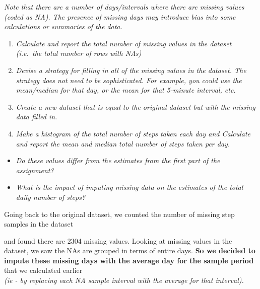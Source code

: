 \documentclass[]{article}
\newenvironment{Shaded}{\begin{snugshade}}{\end{snugshade}}
\newcommand{\KeywordTok}[1]{\textcolor[rgb]{0.13,0.29,0.53}{\textbf{#1}}}
\newcommand{\NormalTok}[1]{#1}
\newcommand{\OperatorTok}[1]{\textcolor[rgb]{0.81,0.36,0.00}{\textbf{#1}}}
\newcommand{\StringTok}[1]{\textcolor[rgb]{0.31,0.60,0.02}{#1}}
\providecommand{\tightlist}{%
  \setlength{\itemsep}{0pt}\setlength{\parskip}{0pt}}
\begin{document}
\emph{Note that there are a number of days/intervals where there are
missing values (coded as NA). The presence of missing days may introduce
bias into some calculations or summaries of the data.}

\begin{enumerate}
\def\labelenumi{\arabic{enumi}.}
\tightlist
\item
  \emph{Calculate and report the total number of missing values in the
  dataset (i.e.~the total number of rows with NAs)}
\item
  \emph{Devise a strategy for filling in all of the missing values in
  the dataset. The strategy does not need to be sophisticated. For
  example, you could use the mean/median for that day, or the mean for
  that 5-minute interval, etc.}
\item
  \emph{Create a new dataset that is equal to the original dataset but
  with the missing data filled in.}
\item
  \emph{Make a histogram of the total number of steps taken each day and
  Calculate and report the mean and median total number of steps taken
  per day.}\\
\end{enumerate}

\begin{itemize}
\tightlist
\item
  \emph{Do these values differ from the estimates from the first part of
  the assignment?}\\
\item
  \emph{What is the impact of imputing missing data on the estimates of
  the total daily number of steps?}
\end{itemize}

Going back to the original dataset, we counted the number of missing
step samples in the dataset

\begin{Shaded}
\end{Shaded}

and found there are 2304 missing values. Looking at missing values in
the dataset, we saw the NAs are grouped in terms of entire days.
\textbf{So we decided to impute these missing days with the average day
for the sample period} that we calculated earlier\\
\emph{(ie - by replacing each NA sample interval with the average for
that interval).}
\end{document}
